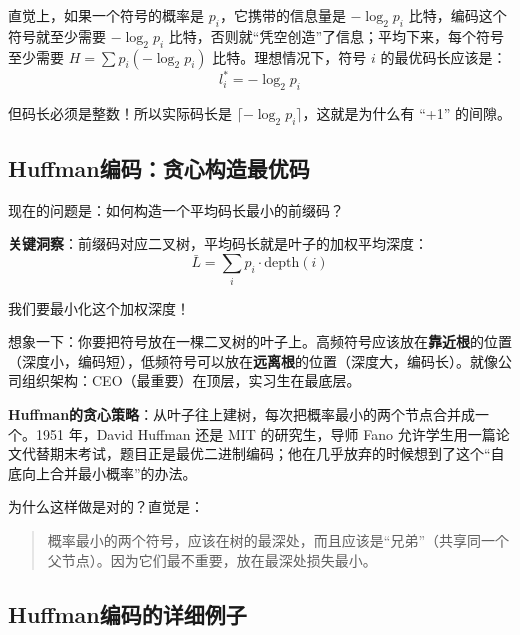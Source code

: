 直觉上，如果一个符号的概率是 $p_i$，它携带的信息量是 $-\log_2 p_i$ 比特，编码这个符号就至少需要 $-\log_2 p_i$ 比特，否则就“凭空创造”了信息；平均下来，每个符号至少需要 $H = \sum p_i (-\log_2 p_i)$ 比特。理想情况下，符号 $i$ 的最优码长应该是：
\begin{equation}
l_i^* = -\log_2 p_i
\end{equation}

但码长必须是整数！所以实际码长是 $\lceil -\log_2 p_i \rceil$，这就是为什么有 “+1” 的间隙。

\subsection{Huffman编码：贪心构造最优码}

现在的问题是：如何构造一个平均码长最小的前缀码？

\textbf{关键洞察}：前缀码对应二叉树，平均码长就是叶子的加权平均深度：
\begin{equation}
\bar{L} = \sum_i p_i \cdot \text{depth}(i)
\end{equation}

我们要最小化这个加权深度！

\begin{physicalmeaning}
想象一下：你要把符号放在一棵二叉树的叶子上。高频符号应该放在\textbf{靠近根}的位置（深度小，编码短），低频符号可以放在\textbf{远离根}的位置（深度大，编码长）。就像公司组织架构：CEO（最重要）在顶层，实习生在最底层。
\end{physicalmeaning}

\textbf{Huffman的贪心策略}：从叶子往上建树，每次把概率最小的两个节点合并成一个。1951 年，David Huffman 还是 MIT 的研究生，导师 Fano 允许学生用一篇论文代替期末考试，题目正是最优二进制编码；他在几乎放弃的时候想到了这个“自底向上合并最小概率”的办法。

为什么这样做是对的？直觉是：
\begin{quote}
概率最小的两个符号，应该在树的最深处，而且应该是“兄弟”（共享同一个父节点）。因为它们最不重要，放在最深处损失最小。
\end{quote}

\subsection{Huffman编码的详细例子}

